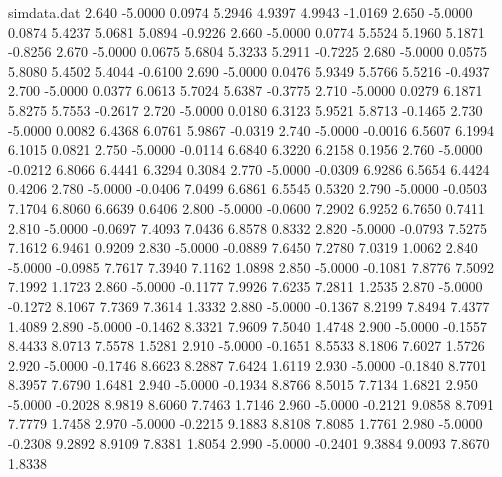 \begin{filecontents*}{simdata.dat}
2.640 -5.0000 0.0974 5.2946 4.9397 4.9943 -1.0169
2.650 -5.0000 0.0874 5.4237 5.0681 5.0894 -0.9226
2.660 -5.0000 0.0774 5.5524 5.1960 5.1871 -0.8256
2.670 -5.0000 0.0675 5.6804 5.3233 5.2911 -0.7225
2.680 -5.0000 0.0575 5.8080 5.4502 5.4044 -0.6100
2.690 -5.0000 0.0476 5.9349 5.5766 5.5216 -0.4937
2.700 -5.0000 0.0377 6.0613 5.7024 5.6387 -0.3775
2.710 -5.0000 0.0279 6.1871 5.8275 5.7553 -0.2617
2.720 -5.0000 0.0180 6.3123 5.9521 5.8713 -0.1465
2.730 -5.0000 0.0082 6.4368 6.0761 5.9867 -0.0319
2.740 -5.0000 -0.0016 6.5607 6.1994 6.1015 0.0821
2.750 -5.0000 -0.0114 6.6840 6.3220 6.2158 0.1956
2.760 -5.0000 -0.0212 6.8066 6.4441 6.3294 0.3084
2.770 -5.0000 -0.0309 6.9286 6.5654 6.4424 0.4206
2.780 -5.0000 -0.0406 7.0499 6.6861 6.5545 0.5320
2.790 -5.0000 -0.0503 7.1704 6.8060 6.6639 0.6406
2.800 -5.0000 -0.0600 7.2902 6.9252 6.7650 0.7411
2.810 -5.0000 -0.0697 7.4093 7.0436 6.8578 0.8332
2.820 -5.0000 -0.0793 7.5275 7.1612 6.9461 0.9209
2.830 -5.0000 -0.0889 7.6450 7.2780 7.0319 1.0062
2.840 -5.0000 -0.0985 7.7617 7.3940 7.1162 1.0898
2.850 -5.0000 -0.1081 7.8776 7.5092 7.1992 1.1723
2.860 -5.0000 -0.1177 7.9926 7.6235 7.2811 1.2535
2.870 -5.0000 -0.1272 8.1067 7.7369 7.3614 1.3332
2.880 -5.0000 -0.1367 8.2199 7.8494 7.4377 1.4089
2.890 -5.0000 -0.1462 8.3321 7.9609 7.5040 1.4748
2.900 -5.0000 -0.1557 8.4433 8.0713 7.5578 1.5281
2.910 -5.0000 -0.1651 8.5533 8.1806 7.6027 1.5726
2.920 -5.0000 -0.1746 8.6623 8.2887 7.6424 1.6119
2.930 -5.0000 -0.1840 8.7701 8.3957 7.6790 1.6481
2.940 -5.0000 -0.1934 8.8766 8.5015 7.7134 1.6821
2.950 -5.0000 -0.2028 8.9819 8.6060 7.7463 1.7146
2.960 -5.0000 -0.2121 9.0858 8.7091 7.7779 1.7458
2.970 -5.0000 -0.2215 9.1883 8.8108 7.8085 1.7761
2.980 -5.0000 -0.2308 9.2892 8.9109 7.8381 1.8054
2.990 -5.0000 -0.2401 9.3884 9.0093 7.8670 1.8338
\end{filecontents*}
